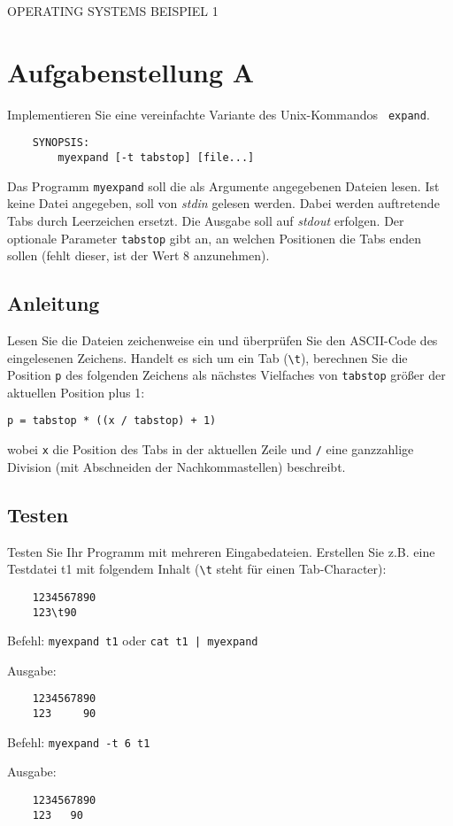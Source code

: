 \documentclass{article}
\begin{document}
\begin{center}
\begin{Large}
OPERATING SYSTEMS BEISPIEL 1
\end{Large}
\end{center}

\section*{Aufgabenstellung A}
Implementieren Sie eine vereinfachte Variante des Unix-Kommandos {\tt
expand}.
\begin{verbatim}
    SYNOPSIS:
        myexpand [-t tabstop] [file...]
\end{verbatim}

Das Programm {\tt myexpand} soll die als Argumente angegebenen Dateien
lesen. Ist keine Datei angegeben, soll von {\it stdin} gelesen werden.
Dabei werden auftretende Tabs durch Leerzeichen ersetzt. Die Ausgabe
soll auf {\it stdout} erfolgen. Der optionale Parameter \verb|tabstop|
gibt an, an welchen Positionen die Tabs enden sollen (fehlt dieser,
ist der Wert 8 anzunehmen).

\subsection*{Anleitung}
Lesen Sie die Dateien zeichenweise ein und überprüfen Sie den
ASCII-Code des eingelesenen Zeichens. Handelt es sich um ein Tab
(\verb|\t|), berechnen Sie die Position \verb|p| des folgenden
Zeichens als nächstes Vielfaches von \verb|tabstop| größer der
aktuellen Position plus 1:

\verb|p = tabstop * ((x / tabstop) + 1)|

wobei \verb|x| die Position des Tabs in der aktuellen Zeile und
\verb|/| eine ganzzahlige Division (mit Abschneiden der
Nachkommastellen) beschreibt.

\subsection*{Testen}
Testen Sie Ihr Programm mit mehreren Eingabedateien. Erstellen Sie
z.B. eine Testdatei t1 mit folgendem Inhalt (\verb|\t| steht für einen
Tab-Character):
\begin{verbatim}
	1234567890
	123\t90
\end{verbatim}

Befehl: \verb!myexpand t1! oder \verb!cat t1 | myexpand!

Ausgabe:
\begin{verbatim}
	1234567890
	123     90
\end{verbatim}

Befehl: \verb!myexpand -t 6 t1!

Ausgabe:
\begin{verbatim}
	1234567890
	123   90
\end{verbatim}
\end{document}
